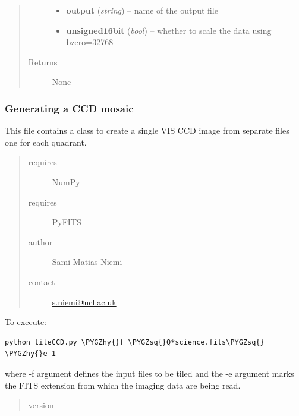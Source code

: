 \documentclass[a4paper,11pt,english]{sphinxmanual}
\def\PYGZhy{\char`\-}
\def\PYGZsq{\char`\'}
\renewcommand\PYGZsq{\textquotesingle}
\begin{document}
\begin{fulllineitems}
\begin{fulllineitems}
\begin{quote}
\begin{description}
\begin{itemize}
\item {} 
\textbf{output} (\emph{string}) -- name of the output file

\item {} 
\textbf{unsigned16bit} (\emph{bool}) -- whether to scale the data using bzero=32768

\end{itemize}

\item[{Returns}] \leavevmode
None

\end{description}\end{quote}

\end{fulllineitems}


\end{fulllineitems}

\label{postproc:module-postproc.tileCCD}

\subsubsection{Generating a CCD mosaic}
\label{postproc:generating-a-ccd-mosaic}
This file contains a class to create a single VIS CCD image from separate files one for each quadrant.
\begin{quote}\begin{description}
\item[{requires}] \leavevmode
NumPy

\item[{requires}] \leavevmode
PyFITS

\item[{author}] \leavevmode
Sami-Matias Niemi

\item[{contact}] \leavevmode
\href{mailto:s.niemi@ucl.ac.uk}{s.niemi@ucl.ac.uk}

\end{description}\end{quote}

To execute:

\begin{Verbatim}[commandchars=\\\{\}]
python tileCCD.py \PYGZhy{}f \PYGZsq{}Q*science.fits\PYGZsq{} \PYGZhy{}e 1
\end{Verbatim}

where -f argument defines the input files to be tiled and the -e argument marks the
FITS extension from which the imaging data are being read.
\begin{quote}\begin{description}
\item[{version}] 

\end{description}\end{quote}
\end{document}
